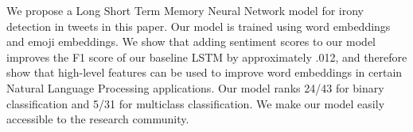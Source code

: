 We propose a Long Short Term Memory Neural Network model for irony detection in tweets in this paper. Our model is trained using word embeddings and emoji embeddings. We show that adding sentiment scores to our model improves the F1 score of our baseline LSTM by approximately .012, and therefore show that high-level features can be used to improve word embeddings in certain Natural Language Processing applications. Our model ranks 24/43 for binary classification and 5/31 for multiclass classification. We make our model easily accessible to the research community.
